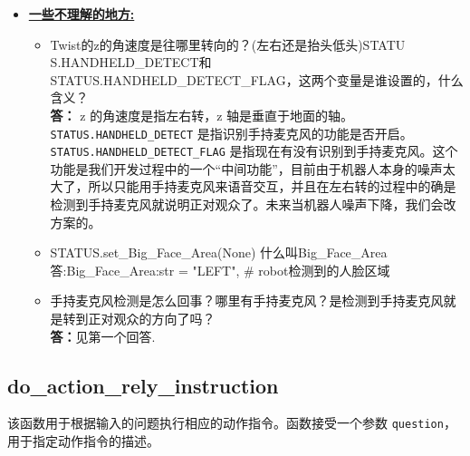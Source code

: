 \documentclass[]{article}
\begin{document}
\begin{itemize}
	\item \textbf{\underline{一些不理解的地方:}}
	\begin{itemize}
		\item {Twist的z的角速度是往哪里转向的？(左右还是抬头低头)STATU \\ S.HANDHELD\_DETECT和 STATUS.HANDHELD\_DETECT\_FLAG，这两个变量是谁设置的，什么含义？}\\
		\textbf{答：} z 的角速度是指左右转，z 轴是垂直于地面的轴。 \texttt{STATUS.HANDHELD\_DETECT} 是指识别手持麦克风的功能是否开启。 \texttt{STATUS.HANDHELD\_DETECT\_FLAG} 是指现在有没有识别到手持麦克风。这个功能是我们开发过程中的一个“中间功能”，目前由于机器人本身的噪声太大了，所以只能用手持麦克风来语音交互，并且在左右转的过程中的确是检测到手持麦克风就说明正对观众了。未来当机器人噪声下降，我们会改方案的。
		\item 
		STATUS.set\_Big\_Face\_Area(None) 什么叫Big\_Face\_Area
		\\答:Big\_Face\_Area:str = "LEFT",                     \# robot检测到的人脸区域
		\item {手持麦克风检测是怎么回事？哪里有手持麦克风？是检测到手持麦克风就是转到正对观众的方向了吗？}\\
		\textbf{答：}见第一个回答.
	\end{itemize}
\end{itemize}
\subsection{do\_action\_rely\_instruction}
该函数用于根据输入的问题执行相应的动作指令。函数接受一个参数 \texttt{question}，用于指定动作指令的描述。
\end{document}
